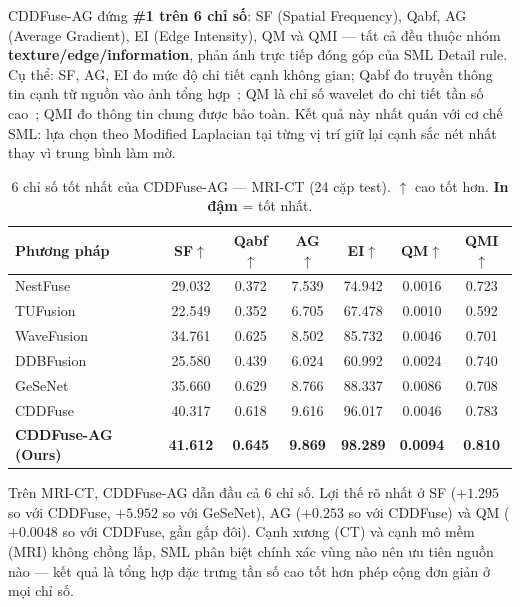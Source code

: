 \documentclass[12pt,a4paper]{article}
\begin{document}
CDDFuse-AG đứng \textbf{\#1 trên 6 chỉ số}: SF (Spatial Frequency), Qabf, AG
(Average Gradient), EI (Edge Intensity), QM và QMI --- tất cả đều thuộc nhóm
\textbf{texture/edge/information}, phản ánh trực tiếp đóng góp của SML Detail
rule. Cụ thể: SF, AG, EI đo mức độ chi tiết cạnh không gian; Qabf đo truyền
thông tin cạnh từ nguồn vào ảnh tổng hợp~\cite{xydeas2000objective}; QM là chỉ
số wavelet đo chi tiết tần số cao~\cite{piella2003new}; QMI đo thông tin chung
được bảo toàn. Kết quả này nhất quán với cơ chế SML: lựa chọn theo Modified
Laplacian tại từng vị trí giữ lại cạnh sắc nét nhất thay vì trung bình làm mờ.

\begin{table}[H]
\centering
\caption{6 chỉ số tốt nhất của CDDFuse-AG --- MRI-CT (24 cặp test).
$\uparrow$ cao tốt hơn. \textbf{In đậm} = tốt nhất.}
\label{tab:best6-ct}
\small
\setlength{\tabcolsep}{5pt}
\begin{tabular}{lcccccc}
\toprule
\textbf{Phương pháp} & \textbf{SF}$\uparrow$ & \textbf{Qabf}$\uparrow$ & \textbf{AG}$\uparrow$ & \textbf{EI}$\uparrow$ & \textbf{QM}$\uparrow$ & \textbf{QMI}$\uparrow$ \\
\midrule
NestFuse~\cite{li2020nestfuse}       & 29.032 & 0.372 & 7.539  & 74.942  & 0.0016 & 0.723 \\
TUFusion~\cite{zhao2024tufusion}     & 22.549 & 0.352 & 6.705  & 67.478  & 0.0010 & 0.592 \\
WaveFusion~\cite{wang2025wavefusion} & 34.761 & 0.625 & 8.502  & 85.732  & 0.0046 & 0.701 \\
DDBFusion~\cite{zhang2025ddbfusion}  & 25.580 & 0.439 & 6.024  & 60.992  & 0.0024 & 0.740 \\
GeSeNet~\cite{li2023gesenet}         & 35.660 & 0.629 & 8.766  & 88.337  & 0.0086 & 0.708 \\
CDDFuse~\cite{zhao2023cddfuse}       & 40.317 & 0.618 & 9.616  & 96.017  & 0.0046 & 0.783 \\
\midrule
\textbf{CDDFuse-AG (Ours)}           & \textbf{41.612} & \textbf{0.645} & \textbf{9.869} & \textbf{98.289} & \textbf{0.0094} & \textbf{0.810} \\
\bottomrule
\end{tabular}
\end{table}

Trên MRI-CT, CDDFuse-AG dẫn đầu cả 6 chỉ số. Lợi thế rõ nhất ở SF ($+1.295$ so
với CDDFuse, $+5.952$ so với GeSeNet), AG ($+0.253$ so với CDDFuse) và QM ($+0.0048$
so với CDDFuse, gần gấp đôi). Cạnh xương (CT) và cạnh mô mềm (MRI) không chồng
lấp, SML phân biệt chính xác vùng nào nên ưu tiên nguồn nào --- kết quả là tổng
hợp đặc trưng tần số cao tốt hơn phép cộng đơn giản ở mọi chỉ số.
\end{document}

